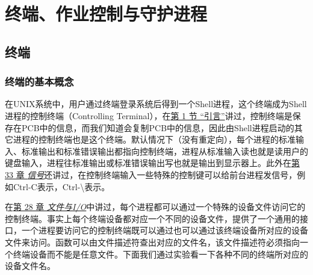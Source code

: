 

\chapter{终端、作业控制与守护进程}
%





\section{终端}
%
\subsection{终端的基本概念}
%


在UNIX系统中，用户通过终端登录系统后得到一个Shell进程，这个终端成为Shell进程的控制终端（Controlling Terminal），在\hyperlink{db.ch30s01.id2865382}{第 1 节 “引言”}讲过，控制终端是保存在PCB中的信息，而我们知道会复制PCB中的信息，因此由Shell进程启动的其它进程的控制终端也是这个终端。默认情况下（没有重定向），每个进程的标准输入、标准输出和标准错误输出都指向控制终端，进程从标准输入读也就是读用户的键盘输入，进程往标准输出或标准错误输出写也就是输出到显示器上。此外在\hyperlink{db.ch33.id2883851}{第 33 章 \emph{信号}}还讲过，在控制终端输入一些特殊的控制键可以给前台进程发信号，例如Ctrl-C表示，Ctrl-\textbackslash{}表示。



在\hyperlink{db.ch28.id2850161}{第 28 章 \emph{文件与I/\BookSplit{}O}}中讲过，每个进程都可以通过一个特殊的设备文件访问它的控制终端。事实上每个终端设备都对应一个不同的设备文件，提供了一个通用的接口，一个进程要访问它的控制终端既可以通过也可以通过该终端设备所对应的设备文件来访问。函数可以由文件描述符查出对应的文件名，该文件描述符必须指向一个终端设备而不能是任意文件。下面我们通过实验看一下各种不同的终端所对应的设备文件名。


